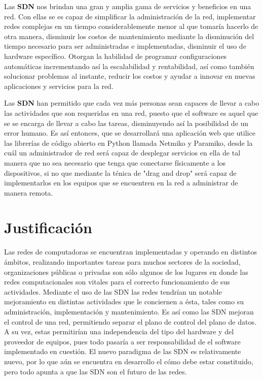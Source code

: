 Las \textbf{SDN} nos brindan una gran y amplia gama de servicios y beneficios en una red. Con ellas se es capaz de
simplificar la administración de la red, implementar redes complejas en un tiempo considerablemente menor al que tomaría
hacerlo de otra manera, disminuir los costos de mantenimiento mediante la disminución del tiempo necesario para ser 
administradas e implementadas, disminuir el uso de hardware específico. Otorgan la habilidad de programar configuraciones
automáticas incrementando así la escalabilidad y rentabilidad, así como también solucionar problemas al instante, 
reducir los costos y ayudar a innovar en nuevas aplicaciones y servicios para la red.  

Las \textbf{SDN}  han permitido que cada vez más personas sean capaces de llevar a cabo las actividades
que son requeridas en una red, puesto que el software es aquel que se se encarga de llevar a cabo las tareas, disminuyendo así la 
posibilidad de un error humano. 
Es así entonces, que se desarrollará una aplicación web que utilice las librerías de código abierto en Python llamada Netmiko y 
Paramiko, desde la cuál un administrador de
red será capaz de desplegar servicios en ella de tal manera que no sea necesario que tenga que conectarse 
físicamente a los dispositivos, si no que mediante la ténica de "drag and drop" será capaz de implementarlos en los equipos que se 
encuentren en la red a
administrar de manera remota.





\section*{Justificación}

Las redes de computadoras se encuentran implementadas y operando en distintos ámbitos, realizando importantes tareas
para muchos sectores de la sociedad, organizaciones públicas o privadas son sólo algunos de los 
lugares en donde las redes computacionales son vitales para el correcto funcionamiento de sus actividades. Mediante el uso de las SDN las redes tendrían un 
notable mejoramiento en distintas actividades que le conciernen a ésta, tales
como su administración, implementación y mantenimiento. Es así como las SDN mejoran el control de una red, permitiendo separar el 
plano de control del plano de datos. A su vez, estas permitirían una independencia del tipo del hardware y del proveedor de equipos, pues todo pasaría a ser 
responsabilidad de el software implementado en cuestión. El nuevo paradigma de las SDN es relativamente nuevo, por lo que aún se 
encuentra en desarrollo el cómo debe estar constituido, pero todo apunta a que las SDN son el futuro de las redes.

